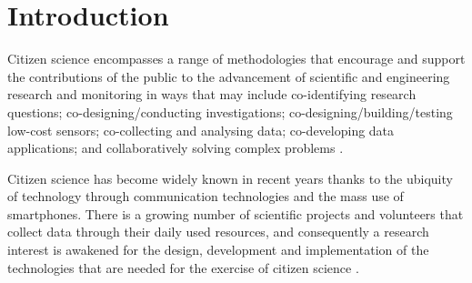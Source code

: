 \documentclass[sigconf]{acmart}
\begin{document}


\maketitle


\section{Introduction}

Citizen science encompasses a range of methodologies that encourage and support the contributions of the public to the advancement of scientific and engineering research and monitoring in ways that may include co-identifying research questions; co-designing/conducting investigations; co-designing/building/testing low-cost sensors; co-collecting and analysing data; co-developing data applications; and collaboratively solving complex problems \cite{vohland_science_2021}.



Citizen science has become widely known in recent years thanks to the ubiquity of technology through communication technologies and the mass use of smartphones. There is a growing number of scientific projects and volunteers that collect data through their daily used resources, and consequently a research interest is awakened for the design, development and implementation of the technologies that are needed for the exercise of citizen science \cite{Preece2016}.

\end{document}
